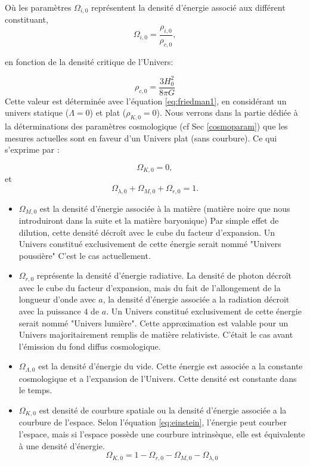 Où les paramètres $\Omega_{i,0}$ représentent la densité d'énergie associé aux différent constituant, 
\begin{equation}
 \Omega_{i,0} = \frac{\rho_{i,0}}{\rho_{c,0}},
 \end{equation}

en fonction de la densité critique de l'Univers:

\begin{equation}
\rho_{c,0} = \frac{3H_0^2}{8\pi G}
 \end{equation}
Cette valeur est déterminée avec l'équation \ref{eq:friedman1}, en considérant un univers statique ($\Lambda=0$) et plat ($\rho_{K,0}=0$).
Nous verrons dans la partie dédiée à la déterminations des paramètres cosmologique (cf Sec \ref{cosmoparam}) que les mesures actuelles sont en faveur d'un Univers plat (sans courbure).
Ce qui s'exprime par :

\begin{equation}
\Omega_{K,0} = 0,
\end{equation}
et
\begin{equation}
\Omega_{\lambda,0} +  \Omega_{M,0} + \Omega_{r,0} =1.
\end{equation}

\begin{itemize}
\item $\Omega_{M,0}$ est la densité d'énergie associée à la matière (matière noire que nous introduiront dans la suite et la matière baryonique)
Par simple effet de dilution, cette densité décroît avec le cube du facteur d'expansion.
Un Univers constitué exclusivement de cette énergie serait nommé "Univers poussière"
C'est le cas actuellement.

\item $\Omega_{r,0}$ représente la densité d'énergie radiative.
La densité de photon décroît avec le cube du facteur d'expansion, mais du fait de l'allongement de la longueur d'onde avec $a$, la densité d'énergie associée a la radiation décroit avec la puissance $4$ de $a$.
Un Univers constitué exclusivement de cette énergie serait nommé "Univers lumière".
Cette approximation est valable pour un Univers majoritairement remplis de matière relativiste.
C'était le cas avant l’émission du fond diffus cosmologique.

\item $\Omega_{\Lambda,0}$ est la densité d’énergie du vide.
Cette énergie est associée a la constante cosmologique et a l'expansion de l'Univers. 
Cette densité est constante dans le temps.

\item $\Omega_{K,0}$ est densité de courbure spatiale ou la densité d'énergie associée a la courbure de l'espace.
Selon l’équation \ref{eq:einstein}, l'énergie peut courber l'espace, mais si l'espace possède une courbure intrinsèque, elle est équivalente à une densité d'énergie.
\begin{equation}
\Omega_{K,0} = 1 - \Omega_{r,0} - \Omega_{M,0} - \Omega_{\lambda,0} 
\end{equation}

\end{itemize}

